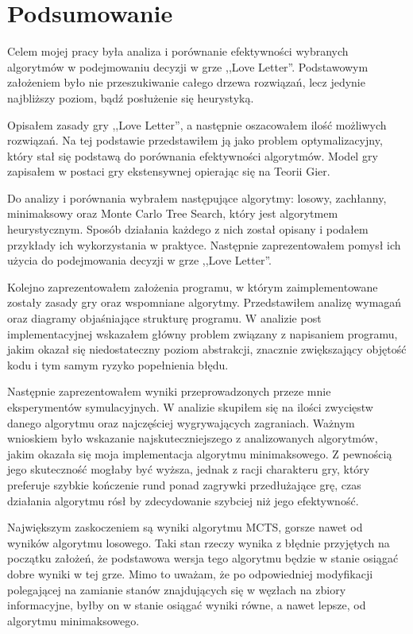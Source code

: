 \chapter{Podsumowanie}
\label{cha:rozdz6}

Celem mojej pracy była analiza i porównanie efektywności wybranych algorytmów w podejmowaniu decyzji w grze ,,Love Letter''. Podstawowym założeniem było nie przeszukiwanie całego drzewa rozwiązań, lecz jedynie najbliższy poziom, bądź posłużenie się heurystyką.

Opisałem zasady gry ,,Love Letter'', a następnie oszacowałem ilość możliwych rozwiązań. Na tej podstawie przedstawiłem ją jako problem optymalizacyjny, który stał się podstawą do porównania efektywności algorytmów. Model gry zapisałem w postaci gry ekstensywnej opierając się na Teorii Gier.

Do analizy i porównania wybrałem następujące algorytmy: losowy, zachłanny, minimaksowy oraz Monte Carlo Tree Search, który jest algorytmem heurystycznym. Sposób działania każdego z nich został opisany i podałem przykłady ich wykorzystania w praktyce. Następnie zaprezentowałem pomysł ich użycia do podejmowania decyzji w grze ,,Love Letter''.

Kolejno zaprezentowałem założenia programu, w którym zaimplementowane zostały zasady gry oraz wspomniane algorytmy. Przedstawiłem analizę wymagań oraz diagramy objaśniające strukturę programu. W analizie post implementacyjnej wskazałem główny problem związany z napisaniem programu, jakim okazał się niedostateczny poziom abstrakcji, znacznie zwiększający objętość kodu i tym samym ryzyko popełnienia błędu.

Następnie zaprezentowałem wyniki przeprowadzonych przeze mnie eksperymentów symulacyjnych. W analizie skupiłem się na ilości zwycięstw danego algorytmu oraz najczęściej wygrywających zagraniach. Ważnym wnioskiem było wskazanie najskuteczniejszego z analizowanych algorytmów, jakim okazała się moja implementacja algorytmu minimaksowego. Z pewnością jego skuteczność mogłaby być wyższa, jednak z racji charakteru gry, który preferuje szybkie kończenie rund ponad zagrywki przedłużające grę, czas działania algorytmu rósł by zdecydowanie szybciej niż jego efektywność. 

Największym zaskoczeniem są wyniki algorytmu MCTS, gorsze nawet od wyników algorytmu losowego. Taki stan rzeczy wynika z błędnie przyjętych na początku założeń, że podstawowa wersja tego algorytmu będzie w stanie osiągać dobre wyniki w tej grze. Mimo to uważam, że po odpowiedniej modyfikacji polegającej na zamianie stanów znajdujących się w węzłach na zbiory informacyjne, byłby on w stanie osiągać wyniki równe, a nawet lepsze, od algorytmu minimaksowego.